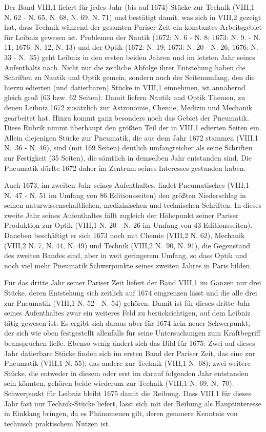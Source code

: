 Der Band VIII,1 liefert für jedes Jahr (bis auf 1674) Stücke zur Technik (VIII,1 N. 62 - N. 65, N. 68, N. 69, N. 71) und bestätigt damit, was sich in VIII,2 gezeigt hat, dass Technik während der gesamten Pariser Zeit ein konstantes Arbeitsgebiet für Leibniz gewesen ist. Problemen der Nautik (1672: N. 6 - N. 8; 1673: N. 9. - N. 11; 1676: N. 12, N. 13) und der Optik (1672: N. 19; 1673: N. 20 - N. 26; 1676: N. 33 - N.~35) geht Leibniz in den ersten beiden Jahren und im letzten Jahr seines Aufenthalts nach. Nicht nur die zeitliche Abfolge ihrer Entstehung haben die Schriften zu Nautik und Optik gemein, sondern auch der Seitenumfang, den die hierzu edierten (und datierbaren) Stücke in VIII,1 einnehmen, ist annähernd gleich groß (63 bzw. 62 Seiten). Damit liefern Nautik und Optik Themen, zu denen Leibniz 1672 zusätzlich zur Astronomie, Chemie, Medizin und Mechanik gearbeitet hat. Hinzu kommt ganz besonders noch das Gebiet der Pneumatik. Diese Rubrik nimmt überhaupt den größten Teil der in VIII,1 edierten Seiten ein. Allein diejenigen Stücke zur Pneumatik, die aus dem Jahr 1672 stammen (VIII,1 N.~36 - N. 46), sind (mit 169 Seiten) deutlich umfangreicher als seine Schriften zur Festigkeit (35 Seiten), die sämtlich in demselben Jahr entstanden sind. Die Pneumatik dürfte 1672 daher im Zentrum seines Interesses gestanden haben. \par
Auch 1673, im zweiten Jahr seines Aufenthaltes, findet Pneumatisches (VIII,1 N.~47 - N. 51 im Umfang von 86 Editionsseiten) den größten Niederschlag in seinen naturwissenschaftlichen, medizinischen und technischen Schriften. In dieses zweite Jahr seines Aufenthaltes fällt zugleich der Höhepunkt seiner Pariser Produktion zur Optik (VIII,1 N. 20 - N. 26 im Umfang von 43 Editionsseiten). Daneben beschäftigt er sich 1673 noch mit Chemie (VIII,2 N. 62), Mechanik (VIII,2 N. 7, N. 44, N. 49) und Technik (VIII,2 N.~90, N. 91), die Gegenstand des zweiten Bandes sind, aber in weit geringerem Umfang, so dass Optik und noch viel mehr Pneumatik Schwerpunkte seines zweiten Jahres in Paris bilden.\par
Für das dritte Jahr seiner Pariser Zeit liefert der Band VIII,1 im Ganzen nur drei Stücke, deren Entstehung sich zeitlich auf 1674 eingrenzen lässt und die alle drei zur Pneumatik (VIII,1 N. 52 - N. 54) gehören. Damit ist für dieses dritte Jahr seines Aufenthaltes zwar ein weiteres Feld zu berücksichtigen, auf dem Leibniz tätig gewesen ist. Es ergibt sich daraus aber für 1674 kein neuer Schwerpunkt, der sich wie oben festgestellt allenfalls für seine Untersuchungen zum Kraftbegriff beanspruchen ließe. Ebenso wenig ändert sich das Bild für 1675: Zwei auf dieses Jahr datierbare Stücke finden sich im ersten Band der Pariser Zeit, das eine zur Pneumatik (VIII,1 N. 55), das andere zur Technik (VIII,1 N. 68); zwei weitere Stücke, die entweder in diesem oder erst im darauf folgenden Jahr entstanden sein könnten, gehören beide wiederum zur Technik (VIII,1 N. 69, N.~70). Schwerpunkt für Leibniz bleibt 1675 damit die Reibung. Dass VIII,1 für dieses Jahr fast nur Technik-Stücke liefert, lässt sich mit der Reibung als Hauptinteresse in Einklang bringen, da es Phänomenen gilt, deren genauere Kenntnis von technisch praktischem Nutzen ist.\par 
